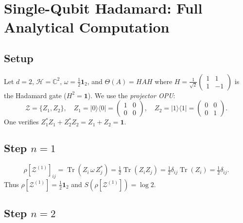 \documentclass[12pt,a4paper]{article}
\DeclareMathOperator{\Tr}{Tr}
\newcommand{\HS}{\mathcal{H}}
\begin{document}
\section{Single-Qubit Hadamard: Full Analytical Computation}
\label{sec:hadamard}

\subsection{Setup}

Let $d=2$, $\HS=\mathbb{C}^2$, $\omega=\frac{1}{2}\mathbf{1}_2$,
and $\Theta(A)=HAH$ where $H=\frac{1}{\sqrt{2}}\begin{pmatrix}1&1\\1&-1\end{pmatrix}$
is the Hadamard gate ($H^2=\mathbf{1}$).  We use the \emph{projector OPU}:
\[
  \mathcal{Z}=\{Z_1,Z_2\},\quad
  Z_1=|0\rangle\langle 0|=\begin{pmatrix}1&0\\0&0\end{pmatrix},\quad
  Z_2=|1\rangle\langle 1|=\begin{pmatrix}0&0\\0&1\end{pmatrix}.
\]
One verifies $Z_1^*Z_1+Z_2^*Z_2=Z_1+Z_2=\mathbf{1}$. \checkmark

\subsection{Step \texorpdfstring{$n=1$}{n=1}}

\[
  \rho[\mathcal{Z}^{(1)}]_{ij}
  = \Tr(Z_i\,\omega\,Z_j^*)
  = \tfrac{1}{2}\Tr(Z_i Z_j)
  = \tfrac{1}{2}\delta_{ij}\Tr(Z_i)
  = \tfrac{1}{2}\delta_{ij}.
\]
Thus $\rho[\mathcal{Z}^{(1)}]=\frac{1}{2}\mathbf{1}_2$ and
$S(\rho[\mathcal{Z}^{(1)}])=\log 2$.

\subsection{Step \texorpdfstring{$n=2$}{n=2}}
\end{document}
